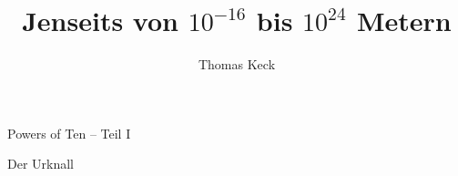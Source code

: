 \documentclass[14pt]{beamer}
\begin{document}
	\author{Thomas Keck}
	\title{Jenseits von $10^{-16}$ bis $10^{24}$ Metern}
	\frame[plain]{\maketitle}
	
	\begin{frame}
		\centering
		\huge{Powers of Ten -- Teil I}
	\end{frame}

\begin{frame}
	\centering
	\huge{Der Urknall}
\end{frame}
\end{document}
